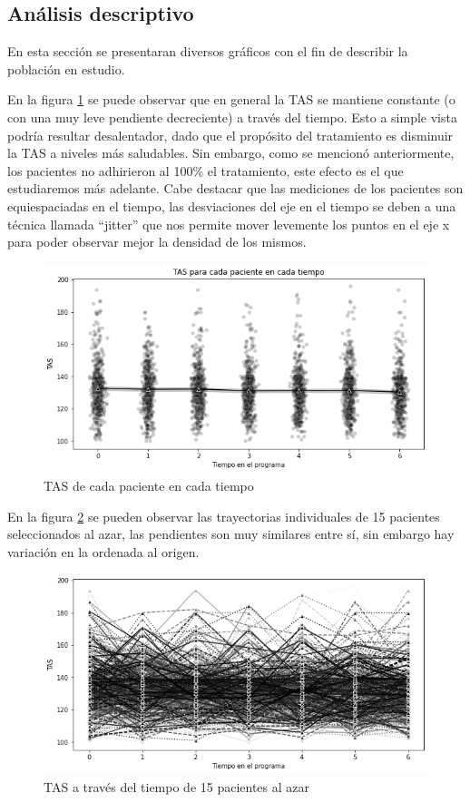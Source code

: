 \documentclass[spanish]{article}
\numberwithin{figure}{subsection}
\numberwithin{equation}{subsection}
\numberwithin{table}{subsection}
\begin{document}
\subsection{Análisis descriptivo}

En esta sección se presentaran diversos gráficos con el fin de describir la
población en estudio.

En la figura \ref{TAS_vs_tpo} se puede observar que en general la TAS se
mantiene constante (o con una muy leve pendiente decreciente) a través del
tiempo. Esto a simple vista podría resultar desalentador, dado que el propósito
del tratamiento es disminuir la TAS a niveles más saludables. Sin embargo, como
se mencionó anteriormente, los pacientes no adhirieron al 100\% el tratamiento,
este efecto es el que estudiaremos más adelante. Cabe destacar que las
mediciones de los pacientes son equiespaciadas en el tiempo, las desviaciones
del eje en el tiempo se deben a una técnica llamada ``jitter'' que nos permite
mover levemente los puntos en el eje x para poder observar mejor la densidad de
los mismos. 

\begin{figure}[H]
	\centering
	\includegraphics[scale=0.5]{img/TAS_vs_tpo.png}
	\caption{TAS de cada paciente en cada tiempo}
	\label{TAS_vs_tpo}
\end{figure}

En la figura \ref{spaghetti} se pueden observar las trayectorias individuales
de 15 pacientes seleccionados al azar, las pendientes son muy similares entre
sí, sin embargo hay variación en la ordenada al origen.

\begin{figure}[H]
	\centering
	\includegraphics[scale=0.5]{img/spaghetti_plot.png}
	\caption{TAS a través del tiempo de 15 pacientes al azar}
	\label{spaghetti}
\end{figure}
\end{document}
